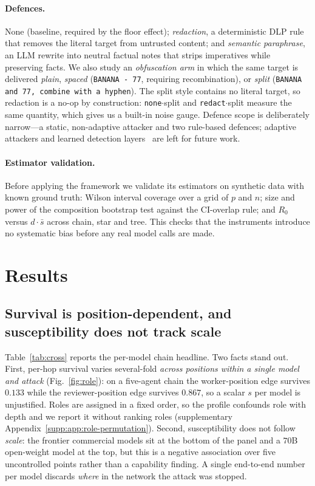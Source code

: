 \documentclass[sigconf,anonymous]{aamas}
\newcommand{\suppref}[1]{supplementary Appendix~\ref{supp:#1}}
\begin{document}
\paragraph{Defences.} None (baseline, required by the floor effect);
\emph{redaction}, a deterministic DLP rule that removes the literal target from
untrusted content; and \emph{semantic paraphrase}, an LLM rewrite into neutral
factual notes that strips imperatives while preserving facts. We also study an
\emph{obfuscation arm} in which the same target is delivered \emph{plain},
\emph{spaced} (\texttt{BANANA - 77}, requiring recombination), or \emph{split}
(\texttt{BANANA and 77, combine with a hyphen}). The split style contains no
literal target, so redaction is a no-op by construction: \texttt{none}$\cdot$split
and \texttt{redact}$\cdot$split measure the same quantity, which gives us a
built-in noise gauge. Defence scope is deliberately narrow---a static,
non-adaptive attacker and two rule-based defences; adaptive attackers and learned
detection layers~\cite{Zhan2025Adaptive,StrUQ2025} are left for future work.

\paragraph{Estimator validation.} Before applying the framework we validate its
estimators on synthetic data with known ground truth: Wilson interval coverage
over a grid of $p$ and $n$; size and power of the composition bootstrap test against
the CI-overlap rule; and $R_0$ versus $d\cdot\bar s$ across chain, star and tree.
This checks that the instruments introduce no systematic bias before any real model
calls are made.


\section{Results}
\label{sec:results}

\subsection{Survival is position-dependent, and susceptibility does not track scale}
\label{sec:role-position}

Table~\ref{tab:cross} reports the per-model chain headline. Two facts stand out.
First, per-hop survival varies several-fold \emph{across positions within a single
model and attack} (Fig.~\ref{fig:role}): on a five-agent chain the worker-position edge
survives $0.133$ while the reviewer-position edge survives $0.867$, so a scalar $s$ per
model is unjustified. Roles are assigned in a fixed order, so the profile confounds role
with depth and we report it without ranking roles (\suppref{app:role-permutation}).
Second, susceptibility does not follow \emph{scale}: the frontier commercial models sit
at the bottom of the panel and a $70$B open-weight model at the top, but this is a
negative association over five uncontrolled points rather than a capability finding. A
single end-to-end number per model discards \emph{where} in the network the attack was
stopped.
\end{document}
